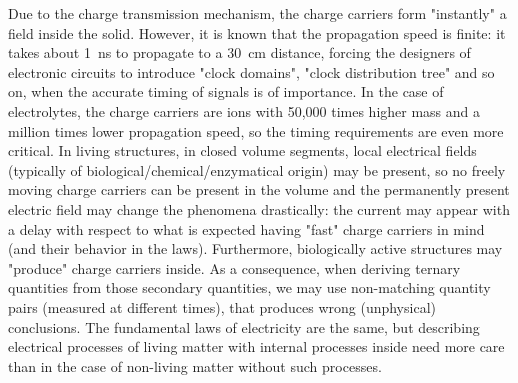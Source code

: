 Due to the charge transmission mechanism, the charge carriers form "instantly" a field inside the solid. However, it is known that the propagation speed is finite: it takes about \SI{1}{\nano\second} to propagate to a \SI{30}{\centi\meter} distance, forcing the designers of electronic circuits
to introduce "clock domains", "clock distribution tree" and so on, when the accurate timing of signals is of importance.
In the case of electrolytes, the charge carriers are ions
with 50,000 times higher mass and a million times lower propagation speed, so the timing requirements are even more critical.
In living structures, in closed volume segments, local
electrical fields (typically of biological/chemical/enzymatical origin)
may be present,
so no freely moving charge carriers can be present in the volume
and the permanently present electric field may change the phenomena drastically: the current may appear with a delay with respect
to what is expected having "fast" charge carriers in mind (and their behavior in the laws). 
Furthermore, biologically active structures may "produce"
charge carriers inside.
As a consequence, when deriving ternary quantities from 
those secondary quantities, we may use non-matching quantity pairs (measured at different times), that produces wrong (unphysical) conclusions.
The fundamental laws of electricity are the same, but describing electrical processes of living matter with 
internal processes inside need more care
than in the case of non-living matter without such processes.   

